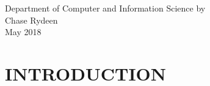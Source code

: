 \documentclass[reqno,12pt,oneside,letter]{report} %
\begin{document}
\setlength{\parindent}{0.5in}

{Department of Computer and Information Science}	%
{by \\
Chase Rydeen\\
May 2018}	%

\initializefrontsections



\makeatletter
\if@twoside \setcounter{page}{4} \else \setcounter{page}{1} \fi
\makeatother

\startabstractpage

\label{Abstract}

\startdedicationspage

\label{Dedication}

\startacknowledgementspage

\label{Acknowledgements}

%

\tableofcontents     %
\listoffigures       %

\startthechapters 

 \chapter{INTRODUCTION}
 \label{chap:Introduction}
 
\end{document}
